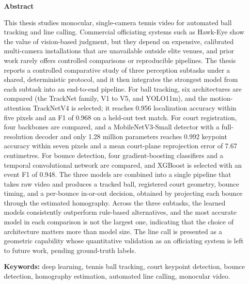 \thispagestyle{fancy}
\begin{center}
    {\Large \textbf{Abstract}}
\end{center}
\vspace{0.6cm}

This thesis studies monocular, single-camera tennis video for automated ball
tracking and line calling. Commercial officiating systems such as Hawk-Eye
show the value of vision-based judgment, but they depend on expensive,
calibrated multi-camera installations that are unavailable outside elite
venues, and prior work rarely offers controlled comparisons or reproducible
pipelines. The thesis reports a controlled comparative study of three
perception subtasks under a shared, deterministic protocol, and it then
integrates the strongest model from each subtask into an end-to-end pipeline.
For ball tracking, six architectures are compared (the TrackNet family, V1 to
V5, and YOLO11m), and the motion-attention TrackNetV4 is selected; it reaches
0.956 localization accuracy within five pixels and an F1 of 0.968 on a
held-out test match. For court registration, four backbones are compared, and
a MobileNetV3-Small detector with a full-resolution decoder and only 1.28
million parameters reaches 0.992 keypoint accuracy within seven pixels and a
mean court-plane reprojection error of 7.67 centimetres. For bounce detection,
four gradient-boosting classifiers and a temporal convolutional network are
compared, and XGBoost is selected with an event F1 of 0.948. The three models
are combined into a single pipeline that takes raw video and produces a
tracked ball, registered court geometry, bounce timing, and a per-bounce
in-or-out decision, obtained by projecting each bounce through the estimated
homography. Across the three subtasks, the learned models consistently
outperform rule-based alternatives, and the most accurate model in each
comparison is not the largest one, indicating that the choice of architecture
matters more than model size. The line call is presented as a geometric
capability whose quantitative validation as an officiating system is left to
future work, pending ground-truth labels.

\vspace{0.6cm}
\noindent\textbf{Keywords:} deep learning, tennis ball tracking, court keypoint
detection, bounce detection, homography estimation, automated line calling,
monocular video.
\clearpage

